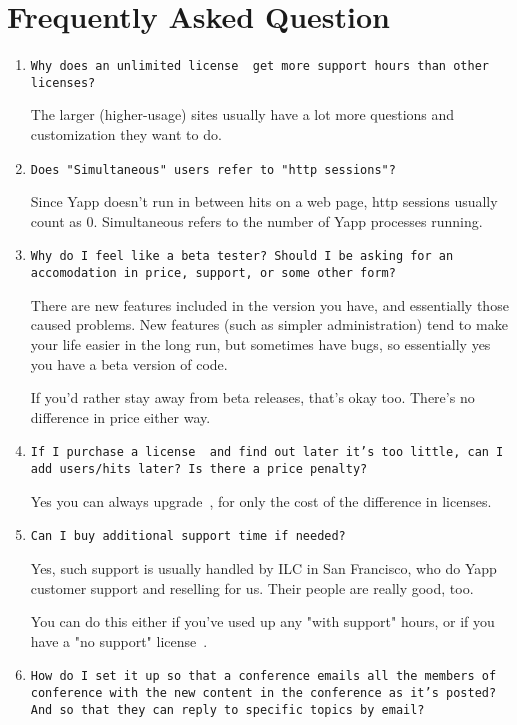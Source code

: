 \documentclass[twoside]{report}
\begin{document}
\chapter{Frequently Asked Question} \label {c:FAQ}
  \begin{enumerate}
   \item {\tt Why does an unlimited license~ get more support 
       hours than other licenses?}

      The larger (higher-usage) sites usually have a lot more questions 
      and customization they want to do.

   \item {\tt Does "Simultaneous" users refer to "http sessions"?}

      Since Yapp doesn't run in between hits on a web page, http sessions
      usually count as 0. Simultaneous refers to the number of Yapp processes 
      running.

   \item {\tt Why do I feel like a beta tester? Should I be asking for an accomodation
        in price, support, or some other form? } 

      There are new features included in the version you have,
      and essentially those caused problems.  New features (such as simpler
      administration) tend to make your life easier in the long run, but
      sometimes have bugs, so essentially yes you have a beta version of
      code.

      If you'd rather stay away from beta releases, that's okay too.
      There's no difference in price either way.


   \item{\tt If I purchase a license~ and find out later 
        it's too little, can I add users/hits later? Is there a price penalty?}

      Yes you can always upgrade~, for only the cost of the 
      difference in licenses.

   \item{\tt Can I buy additional support time if needed? }

      Yes, such support is usually handled by ILC in San Francisco, who do Yapp
      customer support and reselling for us.  Their people are really good, too.

      You can do this either if you've used up any "with support" hours, or
      if you have a "no support" license~.

   \item {\tt How do I set it up so that a conference emails all the members 
        of conference with the new content in the conference as it's 
        posted?  And so that they can reply to specific topics by email? }


\end{enumerate}
\end{document}
